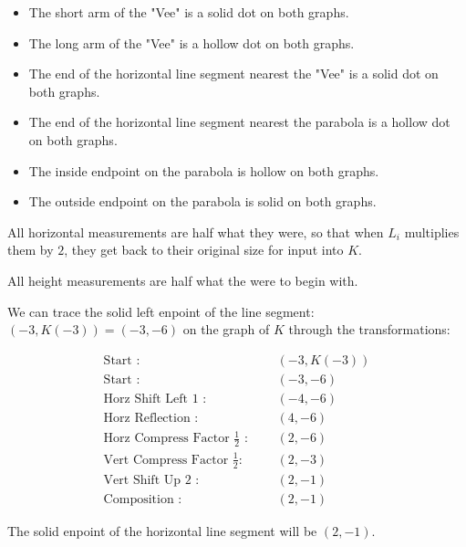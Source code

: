 \documentclass{ximera}
\begin{document}
\begin{itemize}
\item The short arm of the "Vee" is a solid dot on both graphs.
\item The long arm of the "Vee" is a hollow dot on both graphs.
\item The end of the horizontal line segment nearest the "Vee" is a solid dot on both graphs.
\item The end of the horizontal line segment nearest the parabola is a hollow dot on both graphs.
\item The inside endpoint on the parabola is hollow on both graphs.
\item The outside endpoint on the parabola is solid on both graphs.
\end{itemize}










All horizontal measurements are half what they were, so that when $L_i$ multiplies them by $2$, they get back to their original size for input into $K$.

All height measurements are half what the were to begin with.



We can trace the solid left enpoint of the line segment: $(-3, K(-3)) = (-3, -6)$ on the graph of $K$ through the transformations:





\begin{align*}
\text{Start :} & \text{  } & (-3, K(-3))  \\
\text{Start :} & \text{  } & (-3, -6) \\
\text{Horz Shift Left $1$ :} & \text{  } & (-4,-6)   \\
\text{Horz Reflection :} & \text{  } & (4, -6)   \\
\text{Horz Compress Factor $\tfrac{1}{2}$ :}  & \text{  } & (2, -6)   \\
\text{Vert Compress Factor $\tfrac{1}{2}$:} & \text{  } & (2, -3)   \\
\text{Vert Shift Up $2$ :} & \text{  } & (2, -1)   \\
\text{Composition :} & \text{  } & (2, -1)   
\end{align*}


The solid enpoint of the horizontal line segment will be $(2, -1)$.
\end{document}
